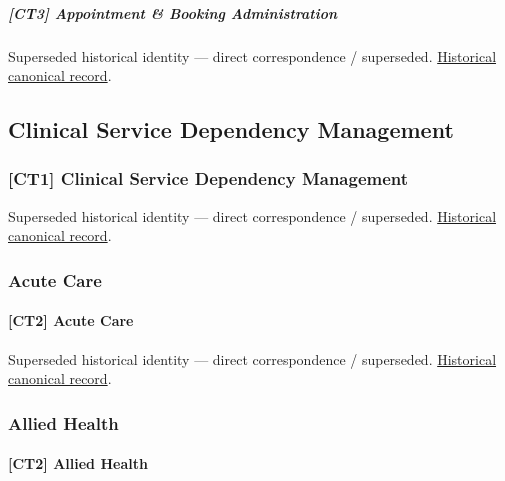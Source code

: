 \subparagraph{[CT3] Appointment \& Booking Administration}

\par\label{element:cdc16dd0f84049f8af3f1ec76f1e1428}
Superseded historical identity — direct correspondence / superseded. \href{../../../../continuum/strategy/capability/cdc16dd0f84049f8af3f1ec76f1e1428.md}{Historical canonical record}.\par

\subsection{Clinical Service Dependency Management}

\subsubsection{[CT1] Clinical Service Dependency Management}

\par\label{element:984ee17123eb4f92b3e55e55d24459b8}
Superseded historical identity — direct correspondence / superseded. \href{../../../../continuum/strategy/capability/984ee17123eb4f92b3e55e55d24459b8.md}{Historical canonical record}.\par

\subsubsection{Acute Care}

\paragraph{[CT2] Acute Care}

\par\label{element:7b591957f7424424abc80f699e9f1960}
Superseded historical identity — direct correspondence / superseded. \href{../../../../continuum/strategy/capability/7b591957f7424424abc80f699e9f1960.md}{Historical canonical record}.\par

\subsubsection{Allied Health}

\paragraph{[CT2] Allied Health}


